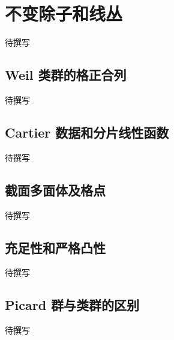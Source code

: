 
% 
% 

\section{不变除子和线丛}
\label{g5:sec:2803}

待撰写

\subsection{Weil 类群的格正合列}
\label{g5:subsec:2803:01}
待撰写

\subsection{Cartier 数据和分片线性函数}
\label{g5:subsec:2803:02}
待撰写

\subsection{截面多面体及格点}
\label{g5:subsec:2803:03}
待撰写

\subsection{充足性和严格凸性}
\label{g5:subsec:2803:04}
待撰写

\subsection{Picard 群与类群的区别}
\label{g5:subsec:2803:05}
待撰写
